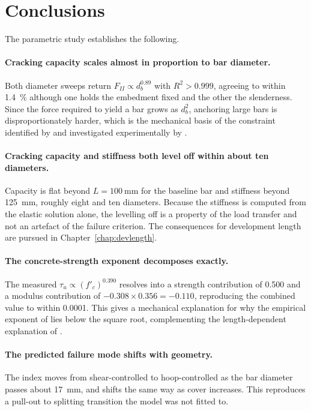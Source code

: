 \section{Conclusions}
\label{sec:paramconc}
 
The parametric study establishes the following.
 
\paragraph{Cracking capacity scales almost in proportion to bar
diameter.}
Both diameter sweeps return $F_{II} \propto d_b^{0.89}$ with
$R^2 > 0.999$, agreeing to within \SI{1.4}{\percent} although one holds the
embedment fixed and the other the slenderness. Since the force required to
yield a bar grows as $d_b^2$, anchoring large bars is disproportionately
harder, which is the mechanical basis of the constraint identified by
\textcite{ngChangesAustralianStandards} and investigated experimentally by
\textcite{fosterDevelopmentLapLengths}.
 
\paragraph{Cracking capacity and stiffness both level off within about
ten diameters.}
Capacity is flat beyond $L = \SI{100}{\milli\metre}$ for the baseline bar
and stiffness beyond \SI{125}{\milli\metre}, roughly eight and ten
diameters. Because the stiffness is computed from the elastic solution
alone, the levelling off is a property of the load transfer and not an
artefact of the failure criterion. The consequences for development length
are pursued in Chapter~\ref{chap:devlength}.
 
\paragraph{The concrete-strength exponent decomposes exactly.}
The measured $\tau_u \propto (f'_c)^{0.390}$ resolves into a strength
contribution of \num{0.500} and a modulus contribution of
$-0.308 \times 0.356 = -0.110$, reproducing the combined value to within
\num{0.0001}. This gives a mechanical explanation for why the empirical
exponent of \textcite{SpliceStrengthConventional2000} lies below the square
root, complementing the length-dependent explanation of
\textcite{harajliComparisonBondStrength2004}.
 
\paragraph{The predicted failure mode shifts with geometry.}
The index moves from shear-controlled to hoop-controlled as the bar diameter
passes about \SI{17}{\milli\metre}, and shifts the same way as cover
increases. This reproduces a pull-out to splitting transition the model was
not fitted to.
 

